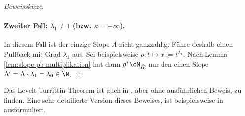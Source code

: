 \begin{proof}[Beweisskizze]
\paragraph{Zweiter Fall: $\lambda_1\neq1$ (bzw. $\kappa = +\infty$).} 
In diesem Fall ist der einzige Slope $\Lambda$ nicht ganzzahlig. Führe deshalb
einen Pullback mit Grad $\lambda_1$ aus.
Sei beispielsweise $\rho:t\mapsto x:=t^{\lambda_1}$.
Nach Lemma \ref{lem:slope-pb-multiplikation} hat dann $\rho^*\cM_{\hat K}$ nur
den einen Slope $\Lambda'=\Lambda\cdot\lambda_1=\lambda_0\in\N$.
\begin{comment}
Damit können wir nun die zugehörige Linearform $\ell':=\lambda_0s_0+s_1$
definieren. Es gilt dass
\[
\sigma_{\ell'}(P')=\dots
\]
ist, welches zumindest zwei unterschiedliche Nullstellen hat. Nun wendet man
den zweiten Unterfall des ersten Fall an.
\end{comment}
\end{proof} %
\begin{bem}
Das Levelt-Turrittin-Theorem ist auch in \cite[Thm 5.4.7]{sabbah_cimpa90}, aber
ohne ausführlichen Beweis, zu finden.
Eine sehr detailierte Version dieses Beweises, ist beispielsweise in \cite[Thm
5.16]{DiplHedwig} ausformuliert.
\end{bem}

\begin{comment}
\subsection{Sabbah's Refined version}
\begin{prop}
\cite[Prop 3.1]{sabbah_Fourier-local}
Jeder irreduzible endlich dimensionale formale meromorphe Zusammenhang
$\cM_{\hat L}$ ist isomorph zu $\rho_+(\sE^\phi\otimes_{\hat K} S)$, wobei
$\phi\in x^{-1}\C[x^-1]$, $\rho:x\mapsto t=x^p$ mit grad $p\geq1$ minimal bzgl.
$\phi$ (siehe \cite[Rem 2.8]{sabbah_Fourier-local}), und $S$ ist ein Rang $1$
$\hat K$-Vektor Raum mit regulärem Zusammenhang.
\end{prop}
\begin{proof}
\cite[Prop 3.1]{sabbah_Fourier-local}
\end{proof}

\begin{thm}[Refined Turrittin-Levelt]
\cite[Cor 3.3]{sabbah_Fourier-local}
Jeder endlich dimensionale meromorphe Zusammenhang $\cM_{\hat K}$ kann in
eindutiger weiße geschrieben werden als direkte Summe $\bigoplus
El(\rho,\phi,R)\bydef\bigoplus\rho_+(\sE^\phi)\otimes R$, so dass
jedes $\rho_+\sE^\phi$ irreduzibel ist und keine zwei $\rho_+\sE^\phi$ isomorph
sind.
\end{thm}
\begin{proof}
\cite[Cor 3.3]{sabbah_Fourier-local}
\end{proof}
\end{comment}

